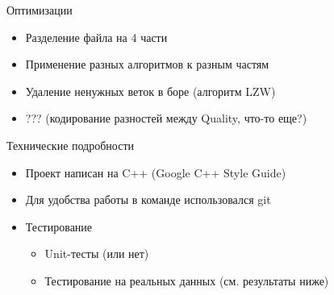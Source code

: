 \documentclass[12pt]{beamer}
\begin{document}
\begin{frame}{Оптимизации}

    \begin{itemize}

        \item <1-> Разделение файла на 4 части

        \item <2-> Применение разных алгоритмов к разным частям 

        \item <3-> Удаление ненужных веток в боре (алгоритм LZW)

        \item <4-> ??? (кодирование разностей между Quality, что-то еще?)
    
    \end{itemize} 

\end{frame}

\begin{frame}{Технические подробности}

    \begin{itemize}
    
        \item <1-> Проект написан на C++ (Google C++ Style Guide)

        \item <2-> Для удобства работы в команде использовался git

        \item <3-> Тестирование

        \begin{itemize}

            \item Unit-тесты (или нет) 

            \item Тестирование на реальных данных (см. результаты ниже)
        
        \end{itemize}

    \end{itemize}

\end{frame}
\end{document}
